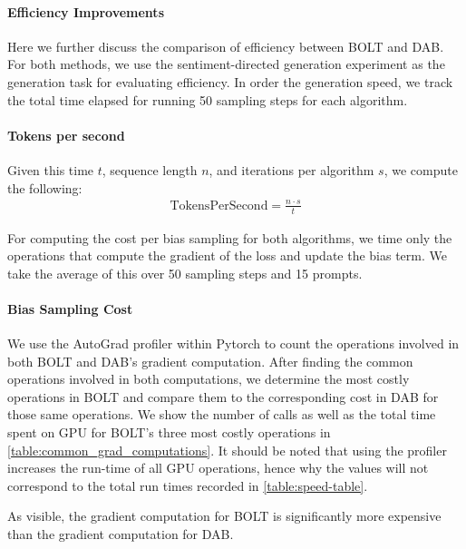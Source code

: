 \paragraph{}

\paragraph{Efficiency Improvements}
Here we further discuss the comparison of efficiency between BOLT and DAB.
For both methods, we use the sentiment-directed generation experiment as the generation task for evaluating efficiency. 
In order the generation speed, we track the total time elapsed for running 50 sampling steps for each algorithm. 
\paragraph{Tokens per second} Given this time $t$, sequence length $n$, and iterations per algorithm $s$, we compute the following: 
\begin{align}
    \text{TokensPerSecond} = \frac{n \cdot s}{t}
\end{align}

For computing the cost per bias sampling for both algorithms, we time only the operations that compute the gradient of the loss and update the bias term. We take the average of this over 50 sampling steps and 15 prompts. 

\paragraph{Bias Sampling Cost} We use the AutoGrad profiler within Pytorch to count the operations involved in both BOLT and DAB's gradient computation. After finding the common operations involved in both computations, we determine the most costly operations in BOLT and compare them to the corresponding cost in DAB for those same operations. We show the number of calls as well as the total time spent on GPU for BOLT's three most costly operations in \ref{table:common_grad_computations}. It should be noted that using the profiler increases the run-time of all GPU operations, hence why the values will not correspond to the total run times recorded in \ref{table:speed-table}.


As visible, the gradient computation for BOLT is significantly more expensive than the gradient computation for DAB. 
